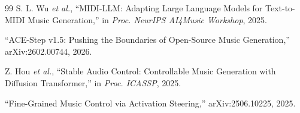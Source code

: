 \documentclass[12pt,a4paper]{article}
\begin{document}
\begin{thebibliography}{99}
S. L. Wu \textit{et al.}, ``MIDI-LLM: Adapting Large Language Models for Text-to-MIDI Music Generation,'' in \textit{Proc. NeurIPS AI4Music Workshop}, 2025.

``ACE-Step v1.5: Pushing the Boundaries of Open-Source Music Generation,'' arXiv:2602.00744, 2026.

Z. Hou \textit{et al.}, ``Stable Audio Control: Controllable Music Generation with Diffusion Transformer,'' in \textit{Proc. ICASSP}, 2025.

``Fine-Grained Music Control via Activation Steering,'' arXiv:2506.10225, 2025.

\end{thebibliography}
\end{document}
